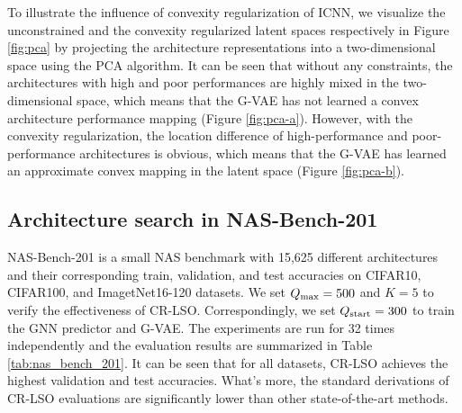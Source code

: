 \documentclass[10pt,twocolumn,letterpaper]{article}
\begin{document}
To illustrate the influence of convexity regularization of ICNN, we visualize the unconstrained and the convexity regularized latent spaces respectively in Figure \ref{fig:pca} by projecting the architecture representations into a two-dimensional space using the PCA algorithm. It can be seen that without any constraints, the architectures with high and poor performances are highly mixed in the two-dimensional space, which means that the G-VAE has not learned a convex architecture performance mapping (Figure \ref{fig:pca-a}). However, with the convexity regularization, the location difference of high-performance and poor-performance architectures is obvious, which means that the G-VAE has learned an approximate convex mapping in the latent space (Figure \ref{fig:pca-b}). 
\subsection{Architecture search in NAS-Bench-201}
NAS-Bench-201 is a small NAS benchmark with 15,625 different architectures and their corresponding train, validation, and test accuracies on CIFAR10, CIFAR100, and ImagetNet16-120 datasets. We set $Q_{\rm max} = 500$ and $K=5$ to verify the effectiveness of CR-LSO. Correspondingly, we set $Q_{\rm start} = 300$ to train the GNN predictor and G-VAE. The experiments are run for 32 times independently and the evaluation results are summarized in Table \ref{tab:nas_bench_201}. It can be seen that for all datasets, CR-LSO achieves the highest validation and test accuracies. What's more, the standard derivations of CR-LSO evaluations are significantly lower than other state-of-the-art methods. 
\end{document}
